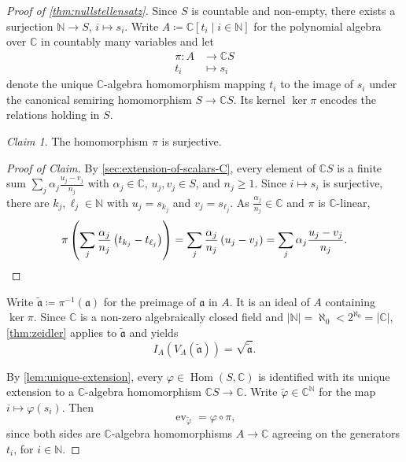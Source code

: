 \documentclass[11pt]{scrartcl}
\theoremstyle{definition}
\theoremstyle{plain}
\theoremstyle{remark}
\newtheorem{claim}[definition]{Claim}
\newenvironment{claimproof}[1][Proof of Claim]{\begin{proof}[#1] \renewcommand{\qedsymbol}{$\lrcorner$}}{ \end{proof}}
\renewcommand\phi\varphi
\DeclareMathOperator\Hom{Hom}
\DeclareMathOperator{\ev}{ev}
\begin{document}
	\begin{proof}[Proof of \cref{thm:nullstellensatz}]
		Since $S$ is countable and non-empty,
		there exists a surjection $\mathbb{N} \to S$, $i \mapsto s_i$.
		Write $A \coloneqq \mathbb{C}[t_i \mid i \in \mathbb{N}]$
		for the polynomial algebra over $\mathbb{C}$ in countably many variables
		and let
		\begin{align*}
			\pi \colon A &\to \mathbb{C}S \\
						t_i &\mapsto s_i
		\end{align*}
		denote the unique $\mathbb{C}$-algebra homomorphism mapping $t_i$ to the image of $s_i$
		under the canonical semiring homomorphism $S \to \mathbb{C}S$.
		Its kernel $\ker \pi$ encodes the relations holding in $S$.

		\begin{claim}\label{cl:pi-surjective}
			The homomorphism $\pi$ is surjective.
		\end{claim}
		\begin{claimproof}
			By \cref{sec:extension-of-scalars-C},
			every element of $\mathbb{C}S$ is a finite sum $\sum_j \alpha_j \frac{u_j - v_j}{n_j}$
			with $\alpha_j \in \mathbb{C}$, $u_j, v_j \in S$, and $n_j \geq 1$.
			Since $i \mapsto s_i$ is surjective,
			there are $k_j, \ell_j \in \mathbb{N}$ with $u_j = s_{k_j}$ and $v_j = s_{\ell_j}$.
			As $\frac{\alpha_j}{n_j} \in \mathbb{C}$ and $\pi$ is $\mathbb{C}$-linear,
			\[
				\pi\left(\sum_j \frac{\alpha_j}{n_j}\left(t_{k_j} - t_{\ell_j}\right)\right)
				= \sum_j \frac{\alpha_j}{n_j}\left(u_j - v_j\right)
				= \sum_j \alpha_j \frac{u_j - v_j}{n_j}. \qedhere
			\]
		\end{claimproof}

		Write $\widetilde{\mathfrak{a}} \coloneqq \pi^{-1}(\mathfrak{a})$ for the preimage of $\mathfrak{a}$ in $A$.
		It is an ideal of $A$ containing $\ker \pi$.
		Since $\mathbb{C}$ is a non-zero algebraically closed field
		and $|\mathbb{N}| = \aleph_0 < 2^{\aleph_0} = |\mathbb{C}|$,
		\cref{thm:zeidler} applies to $\widetilde{\mathfrak{a}}$ and yields
		\begin{equation}\label{eq:zeidler-applied}
			I_A(V_A(\widetilde{\mathfrak{a}})) = \sqrt{\widetilde{\mathfrak{a}}}.
		\end{equation}

		By \cref{lem:unique-extension},
		every $\phi \in \Hom(S, \mathbb{C})$ is identified with its unique extension to a $\mathbb{C}$-algebra homomorphism $\mathbb{C}S \to \mathbb{C}$.
		Write $\widetilde{\phi} \in \mathbb{C}^{\mathbb{N}}$ for the map $i \mapsto \phi(s_i)$.
		Then
		\begin{equation}\label{eq:ev-factors}
			\ev_{\widetilde\phi} = \phi \circ \pi,
		\end{equation}
		since both sides are $\mathbb{C}$-algebra homomorphisms $A \to \mathbb{C}$
		agreeing on the generators $t_i$, for $i \in \mathbb{N}$.


\end{proof}
\end{document}
